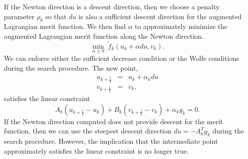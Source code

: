 If the Newton direction is a descent direction, then we choose a 
penalty parameter $\rho_k$ so that $du$ is also a sufficient descent 
direction for the augmented Lagrangian merit function.  We 
then find $\alpha$ to approximately minimize the augmented 
Lagrangian merit function along the Newton direction.
\[
\displaystyle \min_{\alpha \geq 0} \; \tilde{f}_k(u_k + \alpha du, v_k).
\]
We can enforce either the sufficient decrease condition or the 
Wolfe conditions during the search procedure.  The new point, 
\[
\begin{array}{lcl}
u_{k+\frac{1}{2}} & = & u_k + \alpha_k du \\
v_{k+\frac{1}{2}} & = & v_k,
\end{array}
\]
satisfies the linear constraint
\[
A_k (u_{k+\frac{1}{2}} - u_k) + B_k (v_{k+\frac{1}{2}} - v_k) + \alpha_k g_k = 0.
\]
If the Newton direction computed does not provide descent for the merit 
function, then we can use the steepest descent direction $du = -A_k^T g_k$ 
during the search procedure.  However, the implication that the intermediate
point approximately satisfies the linear constraint is no longer true.

